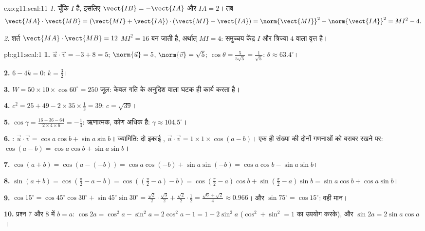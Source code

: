 \begin{solution}{exo:g11:scal:11}
\emph{1.} चूँकि $I$  है, इसलिए $\vect{IB} = -\vect{IA}$ और $IA = 2$। तब
\[
\vect{MA}\cdot\vect{MB}
= (\vect{MI} + \vect{IA})\cdot(\vect{MI} - \vect{IA})
= \norm{\vect{MI}}^2 - \norm{\vect{IA}}^2
= MI^2 - 4 .
\]

\emph{2.} शर्त $\vect{MA}\cdot\vect{MB} = 12$ $MI^2 = 16$ बन जाती है, अर्थात् $MI = 4$: समुच्चय केंद्र $I$ और
त्रिज्या $4$ वाला वृत्त है।
\end{solution}

\begin{solution}{pb:g11:scal:1}
\textbf{1.} $\vec u \cdot \vec v = -3 + 8 = 5$; $\norm{\vec u} = 5$, $\norm{\vec v} = \sqrt5$; $\cos\theta = \frac{5}{5\sqrt5} = \frac{1}{\sqrt5}$: $\theta \approx 63.4^\circ$।

\textbf{2.} $6 - 4k = 0$: $k = \frac32$।

\textbf{3.} $W = 50 \times 10 \times \cos 60^\circ = 250$ जूल: केवल गति के अनुदिश वाला घटक ही कार्य करता है।

\textbf{4.} $c^2 = 25 + 49 - 2 \times 35 \times \frac12 = 39$: $c = \sqrt{39}$।

\textbf{5.} $\cos\gamma = \frac{16 + 36 - 64}{2 \times 4
\times 6} = -\frac14$: ऋणात्मक, कोण अधिक है: $\gamma \approx 104.5^\circ$।

\textbf{6.} : $\vec u \cdot \vec v = \cos a \cos b +
\sin a \sin b$। ज्यामिति: दो इकाई , $\vec u \cdot \vec v = 1 \times 1 \times \cos(a - b)$। एक ही संख्या
की दोनों गणनाओं को बराबर रखने पर: $\cos(a - b) = \cos a \cos b + \sin a \sin b$।

\textbf{7.} $\cos(a + b) = \cos(a - (-b)) = \cos a \cos(-b) +
\sin a \sin(-b) = \cos a \cos b - \sin a \sin b$।

\textbf{8.} $\sin(a + b) = \cos\left(\frac\pi2 - a - b\right)
= \cos\left(\left(\frac\pi2 - a\right) - b\right)
= \cos\left(\frac\pi2 - a\right)\cos b +
\sin\left(\frac\pi2 - a\right)\sin b
= \sin a \cos b + \cos a \sin b$।

\textbf{9.} $\cos 15^\circ = \cos 45^\circ \cos 30^\circ +
\sin 45^\circ \sin 30^\circ = \frac{\sqrt2}{2} \cdot
\frac{\sqrt3}{2} + \frac{\sqrt2}{2} \cdot \frac12 =
\frac{\sqrt6 + \sqrt2}{4} \approx 0.966$। और $\sin 75^\circ = \cos 15^\circ$: वही मान।

\textbf{10.} प्रश्न 7 और 8 में $b = a$: $\cos 2a = \cos^2 a - \sin^2 a = 2\cos^2 a - 1 = 1 - 2\sin^2 a$ ($\cos^2 + \sin^2 = 1$ का उपयोग करके), और $\sin 2a = 2 \sin a \cos a$।


\end{solution}

